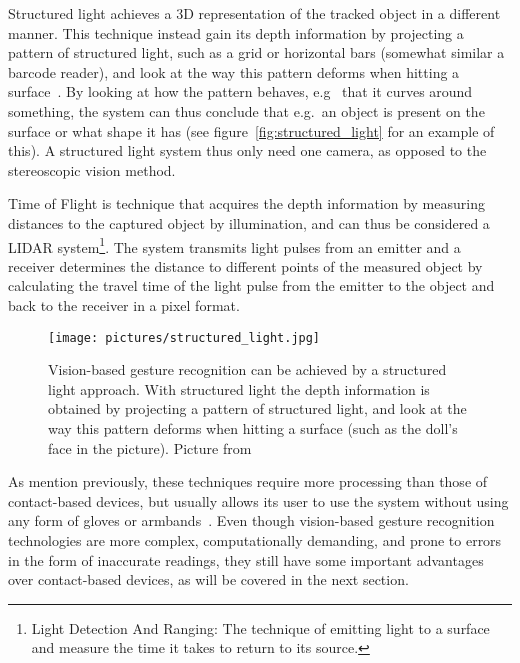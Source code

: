 Structured light achieves a 3D representation of the tracked object in a different manner. This technique instead gain its depth information by projecting a pattern 
of structured light, such as a grid or horizontal bars (somewhat similar a barcode reader), and look at the way this pattern deforms when hitting a surface~\citep{Ko2012}.
By looking at how the pattern behaves, e.g~ that it curves around something, the system can thus conclude that e.g.~an object is present on the surface or what shape it has 
(see figure~\vref{fig:structured_light} for an example of this). 
A structured light system thus only need one camera, as opposed to the stereoscopic vision method. 

Time of Flight is technique that acquires the depth information by measuring distances to the captured object by illumination, and 
can thus be considered a LIDAR system\footnote{Light Detection And Ranging: The technique of emitting light to a surface and measure the time it takes to return to its source.}. 
The system transmits light pulses from an emitter and a receiver determines the distance to different points of the measured object 
by calculating the travel time of the light pulse from the emitter to the object and back to the receiver in a pixel format.

\begin{figure}%
	\texttt{[image: pictures/structured\_light.jpg]}
	\caption[Vision-based recognition by structured light.]{Vision-based gesture recognition can be achieved by a structured light approach.
		With structured light the depth information is obtained by projecting a pattern of structured light, 
		and look at the way this pattern deforms when hitting a surface (such as the doll's face in the picture). Picture from~\citet{Ramamoorthi2007}}
	\label{fig:structured_light}
\end{figure} 

As mention previously, these techniques require more processing than those of contact-based devices, but usually allows its user to use the system
without using any form of gloves or armbands~\citep{Rautaray2015}. 
Even though vision-based gesture recognition technologies are more complex, computationally demanding, and prone to 
errors in the form of inaccurate readings, they still have some important advantages over contact-based devices, as will be covered in the next section.



